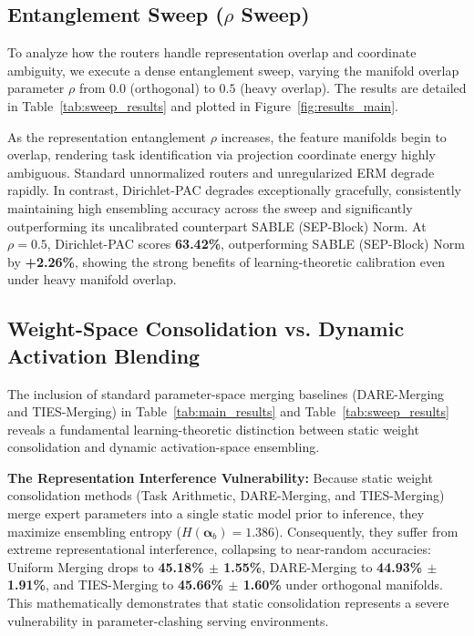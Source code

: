 \subsection{Entanglement Sweep ($\rho$ Sweep)}
To analyze how the routers handle representation overlap and coordinate ambiguity, we execute a dense entanglement sweep, varying the manifold overlap parameter $\rho$ from $0.0$ (orthogonal) to $0.5$ (heavy overlap). The results are detailed in Table~\ref{tab:sweep_results} and plotted in Figure~\ref{fig:results_main}.

As the representation entanglement $\rho$ increases, the feature manifolds begin to overlap, rendering task identification via projection coordinate energy highly ambiguous. Standard unnormalized routers and unregularized ERM degrade rapidly. In contrast, Dirichlet-PAC degrades exceptionally gracefully, consistently maintaining high ensembling accuracy across the sweep and significantly outperforming its uncalibrated counterpart SABLE (SEP-Block) Norm. At $\rho=0.5$, Dirichlet-PAC scores \textbf{63.42\%}, outperforming SABLE (SEP-Block) Norm by \textbf{+2.26\%}, showing the strong benefits of learning-theoretic calibration even under heavy manifold overlap.

\subsection{Weight-Space Consolidation vs. Dynamic Activation Blending}
The inclusion of standard parameter-space merging baselines (DARE-Merging and TIES-Merging) in Table~\ref{tab:main_results} and Table~\ref{tab:sweep_results} reveals a fundamental learning-theoretic distinction between static weight consolidation and dynamic activation-space ensembling.

\textbf{The Representation Interference Vulnerability:}
Because static weight consolidation methods (Task Arithmetic, DARE-Merging, and TIES-Merging) merge expert parameters into a single static model prior to inference, they maximize ensembling entropy ($H(\boldsymbol{\alpha}_b) = 1.386$). Consequently, they suffer from extreme representational interference, collapsing to near-random accuracies: Uniform Merging drops to \textbf{45.18\% $\pm$ 1.55\%}, DARE-Merging to \textbf{44.93\% $\pm$ 1.91\%}, and TIES-Merging to \textbf{45.66\% $\pm$ 1.60\%} under orthogonal manifolds. This mathematically demonstrates that static consolidation represents a severe vulnerability in parameter-clashing serving environments.

